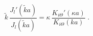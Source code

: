 \begin{equation} 
\tilde k 
\,
\frac{J_l'(\tilde k  a)}{J_l(\tilde k  a)}
=
 \kappa 
\,
\frac{K_{i\Theta}'(\kappa  a)}{K_{i \Theta} (k a)}
\;  .
\label{eq:eigenvalue_2D_ISP_circular_well}
\end{equation}

